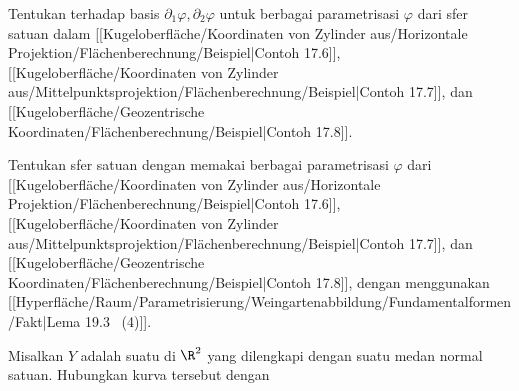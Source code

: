 {}
{

Tentukan
terhadap basis $\partial_1 \varphi, \partial_2 \varphi$ untuk berbagai parametrisasi $\varphi$ dari sfer satuan dalam
[[Kugeloberfläche/Koordinaten von Zylinder aus/Horizontale Projektion/Flächenberechnung/Beispiel|Contoh 17.6]],
[[Kugeloberfläche/Koordinaten von Zylinder aus/Mittelpunktsprojektion/Flächenberechnung/Beispiel|Contoh 17.7]],
dan
[[Kugeloberfläche/Geozentrische Koordinaten/Flächenberechnung/Beispiel|Contoh 17.8]].

}
{} {}

{}
{

Tentukan
sfer satuan dengan memakai berbagai parametrisasi $\varphi$ dari
[[Kugeloberfläche/Koordinaten von Zylinder aus/Horizontale Projektion/Flächenberechnung/Beispiel|Contoh 17.6]],
[[Kugeloberfläche/Koordinaten von Zylinder aus/Mittelpunktsprojektion/Flächenberechnung/Beispiel|Contoh 17.7]],
dan
[[Kugeloberfläche/Geozentrische Koordinaten/Flächenberechnung/Beispiel|Contoh 17.8]],
dengan menggunakan
[[Hyperfläche/Raum/Parametrisierung/Weingartenabbildung/Fundamentalformen/Fakt|Lema 19.3  (4)]].

}
{} {}

{}
{

Misalkan $Y$ adalah suatu
di $\R^2$ yang dilengkapi dengan suatu medan normal satuan. Hubungkan
kurva tersebut dengan

}
{} {}

